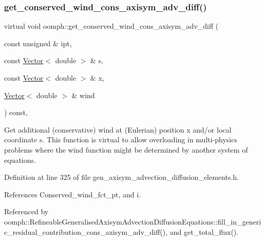 \subsubsection{\texorpdfstring{get\+\_\+conserved\+\_\+wind\+\_\+cons\+\_\+axisym\+\_\+adv\+\_\+diff()}{get\_conserved\_wind\_cons\_axisym\_adv\_diff()}}
{\footnotesize\ttfamily virtual void oomph\+::get\+\_\+conserved\+\_\+wind\+\_\+cons\+\_\+axisym\+\_\+adv\+\_\+diff (\begin{DoxyParamCaption}\item[{const unsigned \&}]{ipt,  }\item[{const \hyperlink{classoomph_1_1Vector}{Vector}$<$ double $>$ \&}]{s,  }\item[{const \hyperlink{classoomph_1_1Vector}{Vector}$<$ double $>$ \&}]{x,  }\item[{\hyperlink{classoomph_1_1Vector}{Vector}$<$ double $>$ \&}]{wind }\end{DoxyParamCaption}) const\hspace{0.3cm}{\ttfamily [inline]}, {\ttfamily [virtual]}}



Get additional (conservative) wind at (Eulerian) position x and/or local coordinate s. This function is virtual to allow overloading in multi-\/physics problems where the wind function might be determined by another system of equations. 



Definition at line 325 of file gen\+\_\+axisym\+\_\+advection\+\_\+diffusion\+\_\+elements.\+h.



References Conserved\+\_\+wind\+\_\+fct\+\_\+pt, and i.



Referenced by oomph\+::\+Refineable\+Generalised\+Axisym\+Advection\+Diffusion\+Equations\+::fill\+\_\+in\+\_\+generic\+\_\+residual\+\_\+contribution\+\_\+cons\+\_\+axisym\+\_\+adv\+\_\+diff(), and get\+\_\+total\+\_\+flux().

\mbox{\label{namespaceoomph_a2e1c951324dd766cdaddac0eb376f78f}} 
